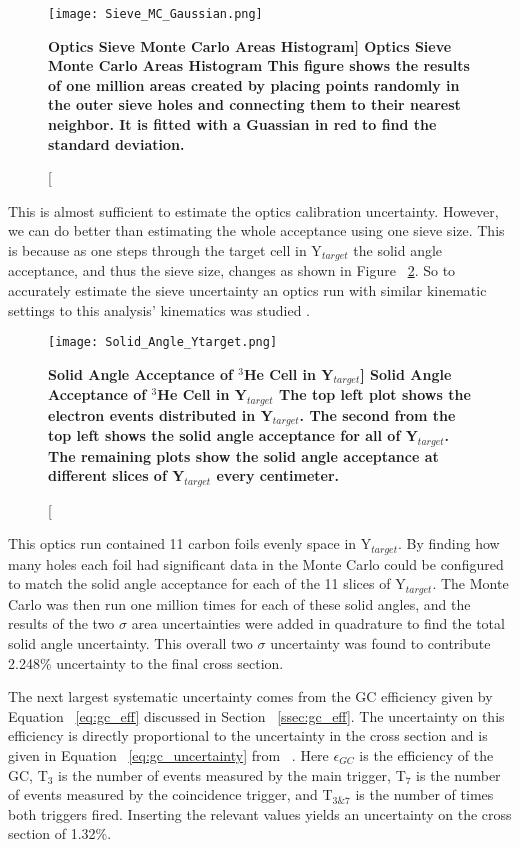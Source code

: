 \begin{figure}[!ht]
\begin{center}
\texttt{[image: Sieve\_MC\_Gaussian.png]}
\end{center}
\caption[\bf{Optics Sieve Monte Carlo Areas Histogram}]{
{\bf{Optics Sieve Monte Carlo Areas Histogram}} This figure shows the results of one million areas created by placing points randomly in the outer sieve holes and connecting them to their nearest neighbor. It is fitted with a Guassian in red to find the standard deviation.}
\label{fig:sieve_mc_gaussian}
\end{figure}

This is almost sufficient to estimate the optics calibration uncertainty. However, we can do better than estimating the whole acceptance using one sieve size. This is because as one steps through the target cell in Y$_{target}$ the solid angle acceptance, and thus the sieve size, changes as shown in Figure ~\ref{fig:solid_angle_ytarget}. So to accurately estimate the sieve uncertainty an optics run with similar kinematic settings to this analysis' kinematics was studied \cite{shujie_optics}. 

\begin{figure}[!ht]
\begin{center}
\texttt{[image: Solid\_Angle\_Ytarget.png]}
\end{center}
\caption[\bf{Solid Angle Acceptance of $^3$He Cell in Y$_{target}$}]{
{\bf{Solid Angle Acceptance of $^3$He Cell in Y$_{target}$}} The top left plot shows the electron events distributed in Y$_{target}$. The second from the top left shows the solid angle acceptance for all of Y$_{target}$. The remaining plots show the solid angle acceptance at different slices of Y$_{target}$ every centimeter.}
\label{fig:solid_angle_ytarget}
\end{figure}

This optics run contained 11 carbon foils evenly space in Y$_{target}$. By finding how many holes each foil had significant data in the Monte Carlo could be configured to match the solid angle acceptance for each of the 11 slices of Y$_{target}$. The Monte Carlo was then run one million times for each of these solid angles, and the results of the two $\sigma$ area uncertainties were added in quadrature to find the total solid angle uncertainty. This overall two $\sigma$ uncertainty was found to contribute 2.248$\%$ uncertainty to the final cross section.

The next largest systematic uncertainty comes from the GC efficiency given by Equation ~\ref{eq:gc_eff} discussed in Section ~\ref{ssec:gc_eff}. The uncertainty on this efficiency is directly proportional to the uncertainty in the cross section and is given in Equation ~\ref{eq:gc_uncertainty} from ~\cite{dien_gc}. Here $\epsilon_{GC}$ is the efficiency of the GC, T$_3$ is the number of events measured by the main trigger, T$_7$ is the number of events measured by the coincidence trigger, and T$_{3\&7}$ is the number of times both triggers fired. Inserting the relevant values yields an uncertainty on the cross section of 1.32$\%$.

